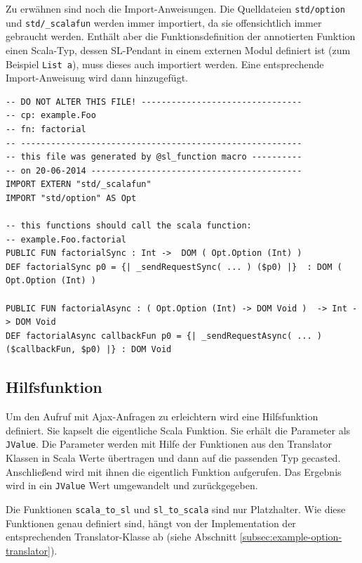\documentclass[12pt,bibtotoc]{scrreprt}
\begin{document}
Zu erwähnen sind noch die Import-Anweisungen. Die Quelldateien \lstinline!std/option! und \lstinline!std/_scalafun! werden immer importiert, da sie offensichtlich immer gebraucht werden. Enthält aber die Funktionsdefinition der annotierten Funktion einen Scala-Typ, dessen SL-Pendant in einem externen Modul definiert ist (zum Beispiel \lstinline!List a!), muss dieses auch importiert werden. Eine entsprechende Import-Anweisung wird dann hinzugefügt.

\begin{lstlisting}[caption=SL-Modul factorial.sl zur Funktion aus Listing \ref{lst:example-function}, label=lst:example-sl-modul, float=h]
-- DO NOT ALTER THIS FILE! --------------------------------
-- cp: example.Foo
-- fn: factorial
-- --------------------------------------------------------
-- this file was generated by @sl_function macro ----------
-- on 20-06-2014 ------------------------------------------
IMPORT EXTERN "std/_scalafun"
IMPORT "std/option" AS Opt

-- this functions should call the scala function:
-- example.Foo.factorial
PUBLIC FUN factorialSync : Int ->  DOM ( Opt.Option (Int) )
DEF factorialSync p0 = {| _sendRequestSync( ... ) ($p0) |}  : DOM ( Opt.Option (Int) )

PUBLIC FUN factorialAsync : ( Opt.Option (Int) -> DOM Void )  -> Int -> DOM Void
DEF factorialAsync callbackFun p0 = {| _sendRequestAsync( ... )  ($callbackFun, $p0) |} : DOM Void
\end{lstlisting}

\subsection{Hilfsfunktion}
\label{subsec:helperfunction}

Um den Aufruf mit Ajax-Anfragen zu erleichtern wird eine Hilfsfunktion definiert. Sie kapselt die eigentliche Scala Funktion. Sie erhält die Parameter als \lstinline!JValue!. Die Parameter werden mit Hilfe der Funktionen aus den Translator Klassen in Scala Werte übertragen und dann auf die passenden Typ gecasted. Anschließend wird mit ihnen die eigentlich Funktion aufgerufen. Das Ergebnis wird in ein \lstinline!JValue! Wert umgewandelt und zurückgegeben.

Die Funktionen \lstinline!scala_to_sl! und \lstinline!sl_to_scala! sind nur Platzhalter. Wie diese Funktionen genau definiert sind, hängt von der Implementation der entsprechenden Translator-Klasse ab (siehe Abschnitt \ref{subsec:example-option-translator}).
\end{document}
